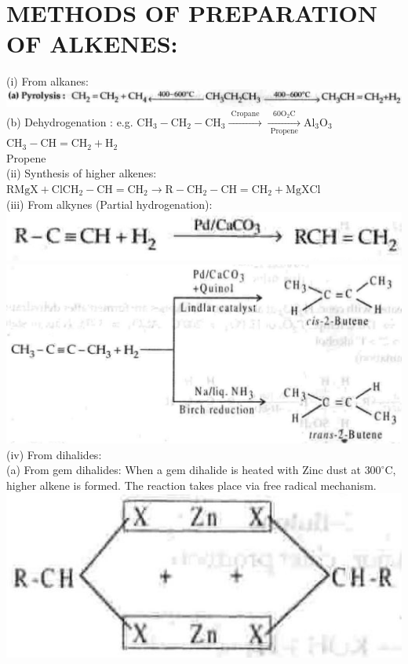 \documentclass[10pt]{article}
\begin{document}
\section*{METHODS OF PREPARATION OF ALKENES:}
(i) From alkanes:\\
\includegraphics[max width=\textwidth, center]{2025_01_28_8470952b98110cec3aabg-177(8)}\\
(b) Dehydrogenation : e.g. $\mathrm{CH}_{3}-\mathrm{CH}_{2}-\mathrm{CH}_{3} \xrightarrow{\text { Cropane }} \xrightarrow[\text { Propene }]{60 \mathrm{O}_{2} \mathrm{C}} \mathrm{Al}_{3} \mathrm{O}_{3}$\\
$\mathrm{CH}_{3}-\mathrm{CH}=\mathrm{CH}_{2}+\mathrm{H}_{2}$\\
Propene\\
(ii) Synthesis of higher alkenes:\\
$\mathrm{RMgX}+\mathrm{ClCH}_{2}-\mathrm{CH}=\mathrm{CH}_{2} \longrightarrow \mathrm{R}-\mathrm{CH}_{2}-\mathrm{CH}=\mathrm{CH}_{2}+\mathrm{MgXCl}$\\
(iii) From alkynes (Partial hydrogenation):\\
\includegraphics[max width=\textwidth, center]{2025_01_28_8470952b98110cec3aabg-177(2)}\\
\includegraphics[max width=\textwidth, center]{2025_01_28_8470952b98110cec3aabg-177(7)}\\
(iv) From dihalides:\\
(a) From gem dihalides: When a gem dihalide is heated with Zinc dust at $300^{\circ} \mathrm{C}$, higher alkene is formed. The reaction takes place via free radical mechanism.\\
\includegraphics[max width=\textwidth, center]{2025_01_28_8470952b98110cec3aabg-177(6)}
\end{document}
